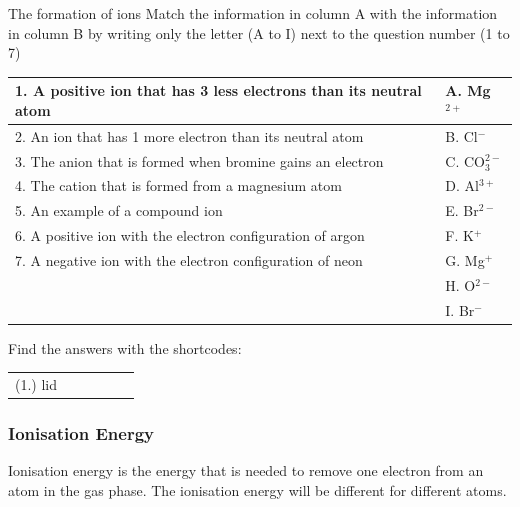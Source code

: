 \begin{exercises}{The formation of ions}
            \nopagebreak
            \label{m38757*id261135}Match the information in column A with the information in column B by writing only the letter (A to I) next to the question number (1 to 7)
\begin{center}
\begin{tabular}{|p{6cm}|p{2cm}|}\hline
1. A positive ion that has 3 less electrons than its neutral atom & A. Mg$^{2+}$ \\\hline
2. An ion that has 1 more electron than its neutral atom & B. Cl$^{-}$ \\\hline
3. The anion that is formed when bromine gains an electron & C. CO$_{3}^{2-}$ \\\hline
4. The cation that is formed from a magnesium atom & D. Al$^{3+}$ \\\hline
5. An example of a compound ion & E. Br$^{2-}$ \\\hline
6. A positive ion with the electron configuration of argon & F. K$^{+}$ \\\hline
7. A negative ion with the electron configuration of neon & G. Mg$^{+}$ \\\hline
 & H. O$^{2-}$ \\\hline
 & I. Br$^{-}$ \\\hline
\end{tabular}
\end{center}
      
\label{m38757*uid132}
\par {} Find the answers with the shortcodes:
 \par \begin{tabular}[h]{cccccc}
 (1.) lid  & \end{tabular}

\end{exercises}

            \subsubsection{ Ionisation Energy}
            \nopagebreak
            \label{m38757*id261078}Ionisation energy is the energy that is needed to remove one electron from an atom in the gas phase. The ionisation energy will be different for different atoms.\par 
        \label{m38757*eip-622}

